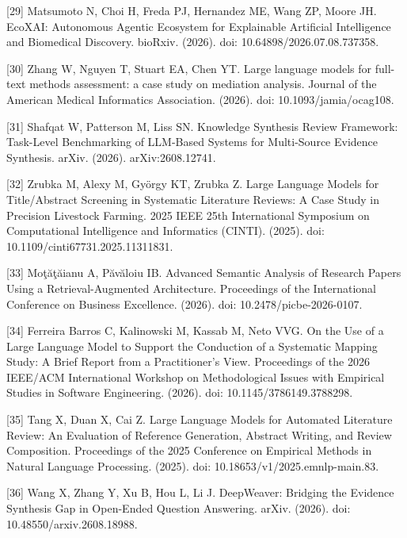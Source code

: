 \documentclass[11pt]{article}
\begin{document}
{[}29{]} Matsumoto N, Choi H, Freda PJ, Hernandez ME, Wang ZP, Moore JH.
EcoXAI: Autonomous Agentic Ecosystem for Explainable Artificial
Intelligence and Biomedical Discovery. bioRxiv. (2026). doi:
10.64898/2026.07.08.737358.

{[}30{]} Zhang W, Nguyen T, Stuart EA, Chen YT. Large language models
for full-text methods assessment: a case study on mediation analysis.
Journal of the American Medical Informatics Association. (2026). doi:
10.1093/jamia/ocag108.

{[}31{]} Shafqat W, Patterson M, Liss SN. Knowledge Synthesis Review
Framework: Task-Level Benchmarking of LLM-Based Systems for Multi-Source
Evidence Synthesis. arXiv. (2026). arXiv:2608.12741.

{[}32{]} Zrubka M, Alexy M, György KT, Zrubka Z. Large Language Models
for Title/Abstract Screening in Systematic Literature Reviews: A Case
Study in Precision Livestock Farming. 2025 IEEE 25th International
Symposium on Computational Intelligence and Informatics (CINTI). (2025).
doi: 10.1109/cinti67731.2025.11311831.

{[}33{]} Moţăţăianu A, Păvăloiu IB. Advanced Semantic Analysis of
Research Papers Using a Retrieval-Augmented Architecture. Proceedings of
the International Conference on Business Excellence. (2026). doi:
10.2478/picbe-2026-0107.

{[}34{]} Ferreira Barros C, Kalinowski M, Kassab M, Neto VVG. On the Use
of a Large Language Model to Support the Conduction of a Systematic
Mapping Study: A Brief Report from a Practitioner's View. Proceedings of
the 2026 IEEE/ACM International Workshop on Methodological Issues with
Empirical Studies in Software Engineering. (2026). doi:
10.1145/3786149.3788298.

{[}35{]} Tang X, Duan X, Cai Z. Large Language Models for Automated
Literature Review: An Evaluation of Reference Generation, Abstract
Writing, and Review Composition. Proceedings of the 2025 Conference on
Empirical Methods in Natural Language Processing. (2025). doi:
10.18653/v1/2025.emnlp-main.83.

{[}36{]} Wang X, Zhang Y, Xu B, Hou L, Li J. DeepWeaver: Bridging the
Evidence Synthesis Gap in Open-Ended Question Answering. arXiv. (2026).
doi: 10.48550/arxiv.2608.18988.
\end{document}
